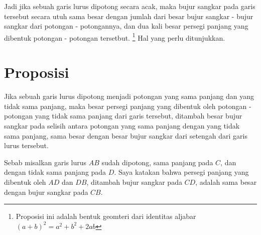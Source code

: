 \documentclass[a4paper]{book}
\begin{document}
Jadi jika sebuah garis lurus dipotong secara acak, maka bujur sangkar pada
garis tersebut secara utuh sama besar dengan jumlah dari besar bujur sangkar -
bujur sangkar dari potongan - potongannya, dan dua kali  besar persegi panjang
yang dibentuk potongan - potongan tersetbut. \footnote{Proposisi ini adalah
bentuk geomteri dari identitas aljabar $(a+b)^2 = a^2 + b^2 + 2ab$}
Hal yang perlu ditunjukkan.

\section*{\centering Proposisi \thesection} 
Jika sebuah garis lurus dipotong menjadi potongan yang sama panjang dan yang
tidak sama panjang, maka besar persegi panjang yang dibentuk oleh potongan - potongan
yang tidak sama panjang dari garis tersebut, ditambah besar bujur sangkar
pada selisih antara potongan yang sama panjang dengan yang tidak sama panjang, 
sama besar dengan besar bujur sangkar dari setengah dari garis lurus tersebut.
\begin{center}
\end{center}
Sebab misalkan garis lurus $AB$ sudah dipotong, sama panjang pada $C$, dan 
dengan tidak sama panjang pada $D$. Saya katakan bahwa persegi panjang yang
dibentuk oleh  $AD$ dan $DB$, ditambah bujur sangkar pada $CD$, adalah sama 
besar dengan bujur sangkar pada $CB$.  
\end{document}
